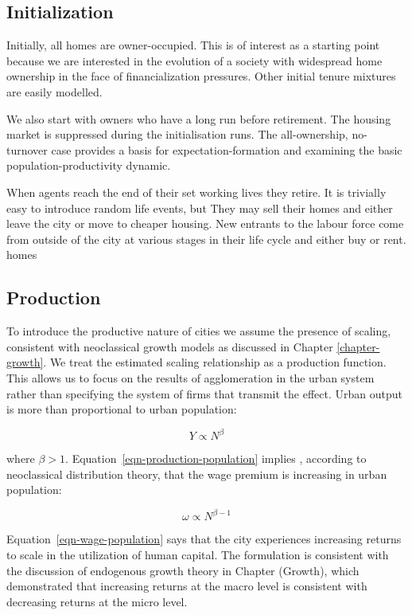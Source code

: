 \subsection{Initialization}
Initially, all homes are owner-occupied. This is of interest  as a starting point because we are interested in the evolution of a society with widespread home ownership in the face of financialization pressures. Other initial tenure mixtures are easily modelled.

We also start with owners who have a long run before retirement. The housing market is suppressed during the initialisation runs. The all-ownership, no-turnover case provides a basis for expectation-formation and examining the basic population-productivity dynamic. 

When agents reach the end of their set working lives they retire. It is trivially easy to introduce random life events, but  They may sell their homes and either leave the city or move to cheaper housing.  New entrants to the labour force come from outside of the city at various stages in their life cycle and either buy or rent. homes 



\subsection{Production}
To introduce  the productive nature of cities we  assume the presence of scaling, consistent with neoclassical growth models as discussed in Chapter \ref{chapter-growth}. We treat the estimated scaling relationship as a production function. This allows us to focus on the results of agglomeration in the urban system rather than specifying the system of firms  that transmit the effect. Urban output is more than proportional to urban population: 

 \begin{equation}
 Y\propto N^{\beta}
 \label{eqn-production-population}
 \end{equation}

where $\beta >1$.  Equation~\ref{eqn-production-population} implies , according to neoclassical distribution theory, that the wage premium is increasing in urban  population:

\begin{equation}
\omega\propto N^{\beta-1}
\label{eqn-wage-population}
\end{equation}

Equation~\ref{eqn-wage-population} says that the city experiences increasing returns to scale in the utilization of human capital. The formulation is  consistent with the discussion of endogenous growth theory in Chapter (Growth), which demonstrated that increasing returns at the macro level is consistent with decreasing returns at the micro level. 

